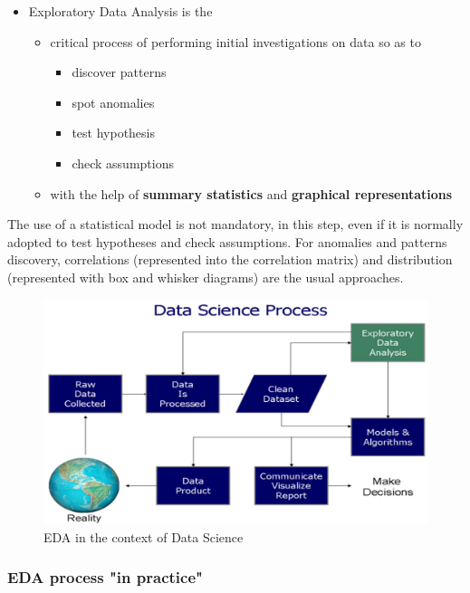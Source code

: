 \documentclass[a4paper]{article}
\begin{document}
		\begin{itemize}
			\item Exploratory Data Analysis is the
				\begin{itemize}
					\item critical process of performing initial investigations on data so as to
						\begin{itemize}
							\item discover patterns
							\item spot anomalies
							\item test hypothesis
							\item check assumptions
						\end{itemize}
					\item with the help of \textbf{summary statistics} and \textbf{graphical representations}
				\end{itemize}
		\end{itemize}
	\noindent
		The use of a statistical model is not mandatory, in this step, even if it is normally adopted to test hypotheses and check assumptions.
		For anomalies and patterns discovery, correlations (represented into the correlation matrix) and distribution (represented with box and whisker diagrams) are the usual approaches.
		
		\begin{figure}[htb!]
			\centering
			\includegraphics[width=.7\textwidth]{img/sw02/eda_context.png}
			\caption{EDA in the context of Data Science}
		\end{figure}
	
			\newpage
	
			\subsubsection{EDA process "in practice"}
			
\end{document}
